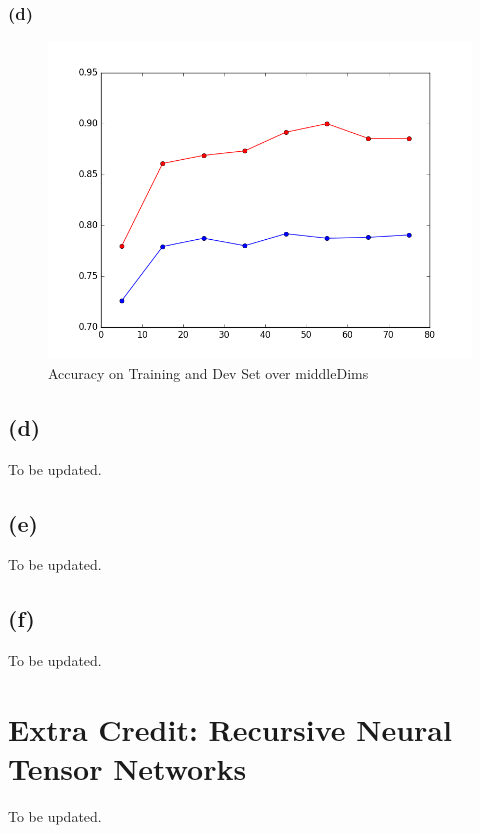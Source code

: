 \documentclass {article}
\begin{document}
\subsubsection*{(d)}
\begin{figure}[H]
\centering
\includegraphics[width=0.7\linewidth]{ps3_2_c_d}
\caption{Accuracy on Training and Dev Set over middleDims}
\label{fig:ps3_2_c_d}
\end{figure}
\subsection*{(d)}
To be updated.
\subsection*{(e)}
To be updated.
\subsection*{(f)}
To be updated.
\section{Extra Credit: Recursive Neural Tensor Networks}
To be updated.
\end{document}
